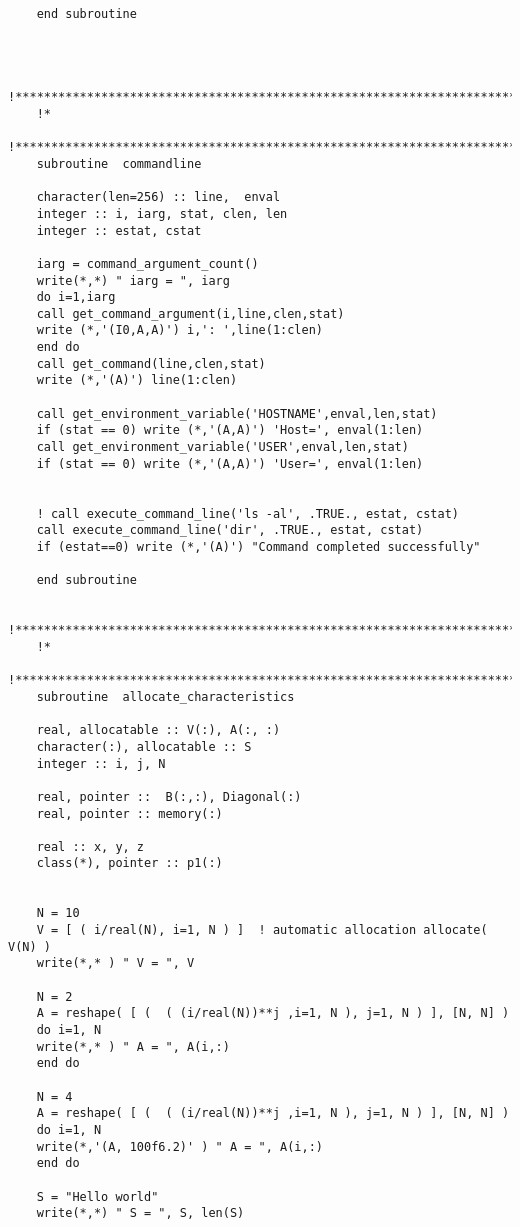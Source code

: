 \begin{verbatim}
    end subroutine 
    
    
    
    !*****************************************************************************
    !*
    !***************************************************************************** 
    subroutine  commandline
    
    character(len=256) :: line,  enval
    integer :: i, iarg, stat, clen, len
    integer :: estat, cstat
    
    iarg = command_argument_count()
    write(*,*) " iarg = ", iarg 
    do i=1,iarg
    call get_command_argument(i,line,clen,stat)
    write (*,'(I0,A,A)') i,': ',line(1:clen)
    end do
    call get_command(line,clen,stat)
    write (*,'(A)') line(1:clen)
    
    call get_environment_variable('HOSTNAME',enval,len,stat)
    if (stat == 0) write (*,'(A,A)') 'Host=', enval(1:len)
    call get_environment_variable('USER',enval,len,stat)
    if (stat == 0) write (*,'(A,A)') 'User=', enval(1:len)
    
    
    ! call execute_command_line('ls -al', .TRUE., estat, cstat)
    call execute_command_line('dir', .TRUE., estat, cstat)
    if (estat==0) write (*,'(A)') "Command completed successfully"
    
    end subroutine 
    
    !*****************************************************************************
    !*
    !***************************************************************************** 
    subroutine  allocate_characteristics 
    
    real, allocatable :: V(:), A(:, :)
    character(:), allocatable :: S 
    integer :: i, j, N 
    
    real, pointer ::  B(:,:), Diagonal(:)  
    real, pointer :: memory(:) 
    
    real :: x, y, z 
    class(*), pointer :: p1(:)
    
    
    N = 10  
    V = [ ( i/real(N), i=1, N ) ]  ! automatic allocation allocate( V(N) ) 
    write(*,* ) " V = ", V
    
    N = 2  
    A = reshape( [ (  ( (i/real(N))**j ,i=1, N ), j=1, N ) ], [N, N] )  
    do i=1, N 
    write(*,* ) " A = ", A(i,:) 
    end do 
    
    N = 4  
    A = reshape( [ (  ( (i/real(N))**j ,i=1, N ), j=1, N ) ], [N, N] )  
    do i=1, N 
    write(*,'(A, 100f6.2)' ) " A = ", A(i,:) 
    end do  
    
    S = "Hello world"
    write(*,*) " S = ", S, len(S)   
    

\end{verbatim}
